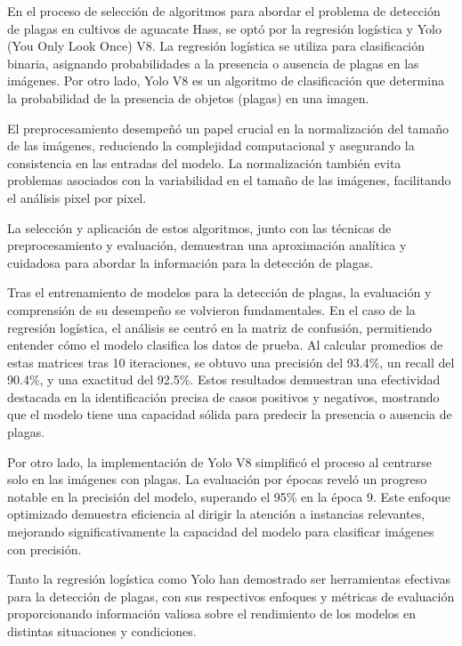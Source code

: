 En el proceso de selección de algoritmos para abordar el problema de detección de plagas en cultivos de aguacate Hass, se optó por la regresión logística y Yolo (You Only Look Once) V8. La regresión logística se utiliza para clasificación binaria, asignando probabilidades a la presencia o ausencia de plagas en las imágenes. Por otro lado, Yolo V8 es un algoritmo de clasificación que determina la probabilidad de la presencia de objetos (plagas) en una imagen. \newline

El preprocesamiento desempeñó un papel crucial en la normalización del tamaño de las imágenes, reduciendo la complejidad computacional y asegurando la consistencia en las entradas del modelo. La normalización también evita problemas asociados con la variabilidad en el tamaño de las imágenes, facilitando el análisis pixel por pixel. \newline

La selección y aplicación de estos algoritmos, junto con las técnicas de preprocesamiento y evaluación, demuestran una aproximación analítica y cuidadosa para abordar la información para la detección de plagas.

\newpage

Tras el entrenamiento de modelos para la detección de plagas, la evaluación y comprensión de su desempeño se volvieron fundamentales. En el caso de la regresión logística, el análisis se centró en la matriz de confusión, permitiendo entender cómo el modelo clasifica los datos de prueba. Al calcular promedios de estas matrices tras 10 iteraciones, se obtuvo una precisión del 93.4\%, un recall del 90.4\%, y una exactitud del 92.5\%. Estos resultados demuestran una efectividad destacada en la identificación precisa de casos positivos y negativos, mostrando que el modelo tiene una capacidad sólida para predecir la presencia o ausencia de plagas. \newline

Por otro lado, la implementación de Yolo V8 simplificó el proceso al centrarse solo en las imágenes con plagas. La evaluación por épocas reveló un progreso notable en la precisión del modelo, superando el 95\% en la época 9. Este enfoque optimizado demuestra eficiencia al dirigir la atención a instancias relevantes, mejorando significativamente la capacidad del modelo para clasificar imágenes con precisión. \newline

Tanto la regresión logística como Yolo han demostrado ser herramientas efectivas para la detección de plagas, con sus respectivos enfoques y métricas de evaluación proporcionando información valiosa sobre el rendimiento de los modelos en distintas situaciones y condiciones. \newline

